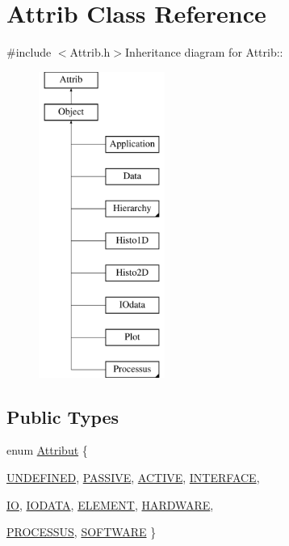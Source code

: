 \hypertarget{classAttrib}{
\section{Attrib Class Reference}
\label{classAttrib}
}


{\ttfamily \#include $<$Attrib.h$>$}Inheritance diagram for Attrib::\begin{figure}[H]
\begin{center}
\leavevmode
\includegraphics[height=10cm]{classAttrib}
\end{center}
\end{figure}
\subsection*{Public Types}
\begin{DoxyCompactItemize}
\item 
enum \hyperlink{classAttrib_a69e171d7cc6417835a5a306d3c764235}{Attribut} \{ \par
\hyperlink{classAttrib_a69e171d7cc6417835a5a306d3c764235a3a8da2ab97dda18aebab196fe4100531}{UNDEFINED}, 
\hyperlink{classAttrib_a69e171d7cc6417835a5a306d3c764235a2bfb2af57b87031d190a05fe25dd92ed}{PASSIVE}, 
\hyperlink{classAttrib_a69e171d7cc6417835a5a306d3c764235a3b1fec929c0370d1436f2f06e298fb0d}{ACTIVE}, 
\hyperlink{classAttrib_a69e171d7cc6417835a5a306d3c764235aa27c16b480a369ea4d18b07b2516bbc7}{INTERFACE}, 
\par
\hyperlink{classAttrib_a69e171d7cc6417835a5a306d3c764235a1420a5b8c0540b2af210b6975eded7f9}{IO}, 
\hyperlink{classAttrib_a69e171d7cc6417835a5a306d3c764235a0af3b0d0ac323c1704e6c69cf90add28}{IODATA}, 
\hyperlink{classAttrib_a69e171d7cc6417835a5a306d3c764235a7788bc5dd333fd8ce18562b269c9dab1}{ELEMENT}, 
\hyperlink{classAttrib_a69e171d7cc6417835a5a306d3c764235a61ceb22149f365f1780d18f9d1459423}{HARDWARE}, 
\par
\hyperlink{classAttrib_a69e171d7cc6417835a5a306d3c764235a75250e29692496e73effca2c0330977f}{PROCESSUS}, 
\hyperlink{classAttrib_a69e171d7cc6417835a5a306d3c764235a103a67cd0b8f07ef478fa45d4356e27b}{SOFTWARE}
 \}
\end{DoxyCompactItemize}
